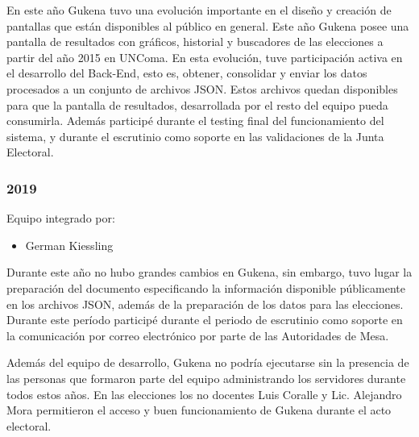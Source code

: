En este año Gukena tuvo una evolución importante en el diseño y creación de pantallas que están disponibles al público en general. Este año Gukena posee una pantalla de resultados con gráficos, historial y buscadores de las elecciones a partir del año 2015 en UNComa. En esta evolución, tuve participación activa en el desarrollo del Back-End, esto es, obtener, consolidar y enviar los datos procesados a un conjunto de archivos JSON. Estos archivos quedan disponibles para que la pantalla de resultados, desarrollada por el resto del equipo pueda consumirla. Además participé durante el testing final del funcionamiento del sistema, y durante el escrutinio como soporte en las validaciones de la Junta Electoral.

\subsubsection{2019}
Equipo integrado por:
\begin{itemize}
    \item German Kiessling
\end{itemize}

Durante este año no hubo grandes cambios en Gukena, sin embargo, tuvo lugar la preparación del documento especificando la información disponible públicamente en los archivos JSON, además de la preparación de los datos para las elecciones. Durante este período participé durante el periodo de escrutinio como soporte en la comunicación por correo electrónico por parte de las Autoridades de Mesa.

Además del equipo de desarrollo, Gukena no podría ejecutarse sin la presencia de las personas que formaron parte del equipo administrando los servidores durante todos estos años. En las elecciones los no docentes Luis Coralle y Lic. Alejandro Mora permitieron el acceso y buen funcionamiento de Gukena durante el acto electoral.


